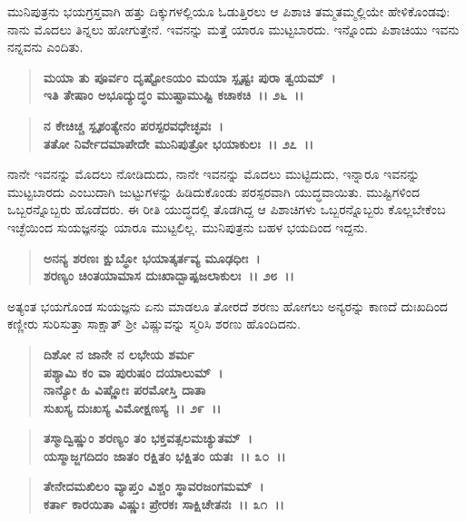 ಮುನಿಪುತ್ರನು ಭಯಗ್ರಸ್ತವಾಗಿ ಹತ್ತು ದಿಕ್ಕುಗಳಲ್ಲಿಯೂ ಓಡುತ್ತಿರಲು ಆ ಪಿಶಾಚಿ ತಮ್ಮತಮ್ಮಲ್ಲಿಯೇ ಹೇಳಿಕೊಂಡವು: ನಾನು ಮೊದಲು ತಿನ್ನಲು ಹೋಗುತ್ತೇನೆ. ಇವನನ್ನು ಮತ್ತೆ ಯಾರೂ ಮುಟ್ಟಬಾರದು. ಇನ್ನೊಂದು ಪಿಶಾಚಿಯು ಇವನು ನನ್ನವನು ಎಂದಿತು.

\begin{verse}
\textbf{ಮಯಾ ತು ಪೂರ್ವಂ ದೃಷ್ಟೋಽಯಂ ಮಯಾ ಸ್ಪೃಷ್ಟಃ ಪುರಾ ತ್ವಯಮ್~।}\\\textbf{ಇತಿ ತೇಷಾಂ ಅಭೂದ್ಯುದ್ಧಂ ಮುಷ್ಟಾಮುಷ್ಟಿ ಕಚಾಕಚಿ~।। ೨೬~।।}
\end{verse}

\begin{verse}
\textbf{ನ ಕೇಚಿಚ್ಚ ಸ್ಪೃಶಂತ್ಯೇನಂ ಪರಸ್ಪರವಧೇಚ್ಛವಃ~।}\\\textbf{ತತೋ ನಿರ್ವೇದಮಾಪೇದೇ ಮುನಿಪುತ್ರೋ ಭಯಾಕುಲಃ~।। ೨೭~।।}
\end{verse}

ನಾನೇ ಇವನನ್ನು ಮೊದಲು ನೋಡಿದುದು, ನಾನೇ ಇವನನ್ನು ಮೊದಲು ಮುಟ್ಟಿದುದು, ಇನ್ನಾರೂ ಇವನನ್ನು ಮುಟ್ಟಬಾರದು ಎಂಬುದಾಗಿ ಜುಟ್ಟುಗಳನ್ನು ಹಿಡಿದುಕೊಂಡು ಪರಸ್ಪರವಾಗಿ ಯುದ್ಧವಾಯಿತು. ಮುಷ್ಟಿಗಳಿಂದ ಒಬ್ಬರನ್ನೊಬ್ಬರು ಹೊಡೆದರು. ಈ ರೀತಿ ಯುದ್ಧದಲ್ಲಿ ತೊಡಗಿದ್ದ ಆ ಪಿಶಾಚಿಗಳು ಒಬ್ಬರನ್ನೊಬ್ಬರು ಕೊಲ್ಲಬೇಕೆಂಬ ಇಚ್ಛೆಯಿಂದ ಸುಯಜ್ಞನನ್ನು ಯಾರೂ ಮುಟ್ಟಲಿಲ್ಲ. ಮುನಿಪುತ್ರನು ಬಹಳ ಭಯದಿಂದ ಇದ್ದನು.

\begin{verse}
\textbf{ಅನನ್ಯ ಶರಣಃ ಕ್ಷುಬ್ಧೋ ಭಯಾತ್ಕರ್ತವ್ಯ ಮೂಢಧೀಃ~।}\\\textbf{ಶರಣ್ಯಂ ಚಿಂತಯಾಮಾಸ ದುಃಖಾದ್ಬಾಷ್ಪಜಲಾಕುಲಃ~।। ೨೮~।।}
\end{verse}

ಅತ್ಯಂತ ಭಯಗೊಂಡ ಸುಯಜ್ಞನು ಏನು ಮಾಡಲೂ ತೋರದೆ ಶರಣು ಹೋಗಲು ಅನ್ಯರನ್ನು ಕಾಣದೆ ದುಃಖದಿಂದ ಕಣ್ಣೀರು ಸುರಿಸುತ್ತಾ ಸಾಕ್ಷಾತ್ ಶ‍್ರೀ ವಿಷ್ಣುವನ್ನು ಸ್ಮರಿಸಿ ಶರಣು ಹೊಂದಿದನು.

\begin{verse}
\textbf{ದಿಶೋ ನ ಜಾನೇ ನ ಲಭೇಯ ಶರ್ಮ\enginline{-}} \\\textbf{ಪಶ್ಯಾಮಿ ಕಂ ವಾ ಪುರುಷಂ ದಯಾಲುಮ್~।}\\\textbf{ನಾನ್ಯೋ ಹಿ ವಿಷ್ಣೋಃ ಪರಮೋಸ್ತಿ ದಾತಾ\enginline{-}} \\\textbf{ಸುಖಸ್ಯ ದುಃಖಸ್ಯ ವಿಮೋಕ್ಷಣಸ್ಯ~।। ೨೯~।। }
\end{verse}

\begin{verse}
\textbf{ತಸ್ಮಾದ್ವಿಷ್ಣುಂ ಶರಣ್ಯಂ ತಂ ಭಕ್ತವತ್ಸಲಮಚ್ಯುತಮ್~।}\\\textbf{ಯಸ್ಮಾಜ್ಜಗದಿದಂ ಜಾತಂ ರಕ್ಷಿತಂ ಭಕ್ಷಿತಂ ಯತಃ~।। ೩೦~।।} 
\end{verse}

\begin{verse}
\textbf{ತೇನೇದಮಖಿಲಂ ವ್ಯಾಪ್ತಂ ವಿಶ್ಚಂ ಸ್ಥಾವರಜಂಗಮಮ್~।}\\\textbf{ಕರ್ತಾ ಕಾರಯಿತಾ ವಿಷ್ಣುಃ ಪ್ರೇರಕಃ ಸಾಕ್ಷಿಚೇತನಃ~।। ೩೧~।।}
\end{verse}

